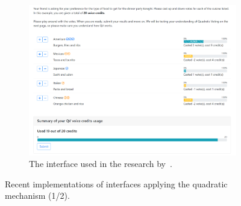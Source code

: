 \begin{figure}
    \centering
    \begin{subfigure}[h]{0.6\textwidth}
        \centering
        \includegraphics[width=\textwidth]{content/image/curr_interface/cheng_qv.png}
        \caption{The interface used in the research by~\textcite{chengCanShowWhat2021}.}
        \label{fig:chengInterface}
    \end{subfigure}
    \caption{Recent implementations of interfaces applying the quadratic mechanism (1/2).}
    \label{fig:recentInterfaces1}
\end{figure}

